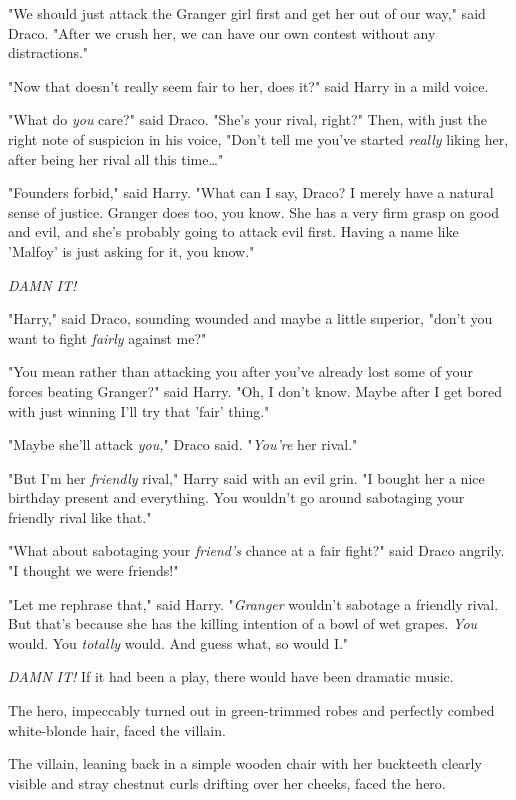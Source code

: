 "We should just attack the Granger girl first and get her out of our way," said 
Draco. "After we crush her, we can have our own contest without any 
distractions."

"Now that doesn't really seem fair to her, does it?" said Harry in a mild voice.

"What do \emph{you} care?" said Draco. "She's your rival, right?" Then, with 
just the right note of suspicion in his voice, "Don't tell me you've started 
\emph{really} liking her, after being her rival all this time{\ldots}"

"Founders forbid," said Harry. "What can I say, Draco? I merely have a natural 
sense of justice. Granger does too, you know. She has a very firm grasp on good 
and evil, and she's probably going to attack evil first. Having a name like 
'Malfoy' is just asking for it, you know."

\emph{DAMN IT!}

"Harry," said Draco, sounding wounded and maybe a little superior, "don't you 
want to fight \emph{fairly} against me?"

"You mean rather than attacking you after you've already lost some of your 
forces beating Granger?" said Harry. "Oh, I don't know. Maybe after I get bored 
with just winning I'll try that 'fair' thing."

"Maybe she'll attack \emph{you,}" Draco said. "\emph{You're} her rival."

"But I'm her \emph{friendly} rival," Harry said with an evil grin. "I bought 
her a nice birthday present and everything. You wouldn't go around sabotaging 
your friendly rival like that."

"What about sabotaging your \emph{friend's} chance at a fair fight?" said Draco 
angrily. "I thought we were friends!"

"Let me rephrase that," said Harry. "\emph{Granger} wouldn't sabotage a 
friendly rival. But that's because she has the killing intention of a bowl of 
wet grapes. \emph{You} would. You \emph{totally} would. And guess what, so 
would I."

\emph{DAMN IT!}
\sbreak
If it had been a play, there would have been dramatic music.

The hero, impeccably turned out in green-trimmed robes and perfectly combed 
white-blonde hair, faced the villain.

The villain, leaning back in a simple wooden chair with her buckteeth clearly 
visible and stray chestnut curls drifting over her cheeks, faced the hero.

